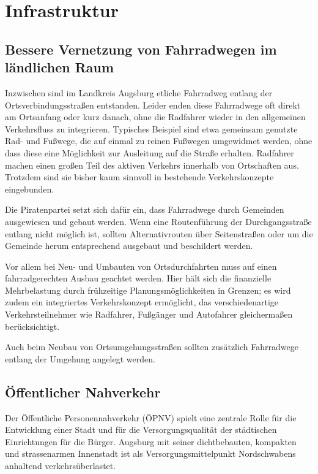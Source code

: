 \chapter{Infrastruktur}

  \section{Bessere Vernetzung von Fahrradwegen im ländlichen Raum}
  
  Inzwischen sind im Landkreis Augsburg etliche Fahrradweg entlang der 
  Ortsverbindungsstraßen entstanden. Leider enden diese Fahrradwege oft direkt 
  am Ortsanfang oder kurz danach, ohne die Radfahrer wieder in den allgemeinen 
  Verkehrsfluss zu integrieren. Typisches Beispiel sind etwa gemeinsam 
  genutzte Rad- und Fußwege, die auf einmal zu reinen Fußwegen umgewidmet 
  werden, ohne dass diese eine Möglichkeit zur Ausleitung auf die Straße 
  erhalten. Radfahrer machen einen großen Teil des aktiven Verkehrs innerhalb 
  von Ortschaften aus. Trotzdem sind sie bisher kaum sinnvoll in bestehende 
  Verkehrskonzepte eingebunden.
  
  Die Piratenpartei setzt sich dafür ein, dass Fahrradwege durch Gemeinden 
  ausgewiesen und gebaut werden. Wenn eine Routenführung der Durchgangsstraße 
  entlang nicht möglich ist, sollten Alternativrouten über Seitenstraßen oder 
  um die Gemeinde herum entsprechend ausgebaut und beschildert werden.
  
  Vor allem bei Neu- und Umbauten von Ortsdurchfahrten muss auf einen 
  fahrradgerechten Ausbau geachtet werden. Hier hält sich die finanzielle 
  Mehrbelastung durch frühzeitige Planungsmöglichkeiten in Grenzen; es wird 
  zudem ein integriertes Verkehrskonzept ermöglicht, das verschiedenartige 
  Verkehrsteilnehmer wie Radfahrer, Fußgänger und Autofahrer gleichermaßen 
  berücksichtigt.
  
  Auch beim Neubau von Ortsumgehungsstraßen sollten zusätzlich Fahrradwege 
  entlang der Umgehung angelegt werden.
  
  \section{Öffentlicher Nahverkehr}
  
  Der Öffentliche Personennahverkehr (ÖPNV) spielt eine zentrale Rolle für die 
  Entwicklung einer Stadt und für die Versorgungsqualität der städtischen 
  Einrichtungen für die Bürger. Augsburg mit seiner dichtbebauten, kompakten 
  und strassenarmen Innenstadt ist als Versorgungsmittelpunkt Nordschwabens 
  anhaltend verkehrsüberlastet.
  
